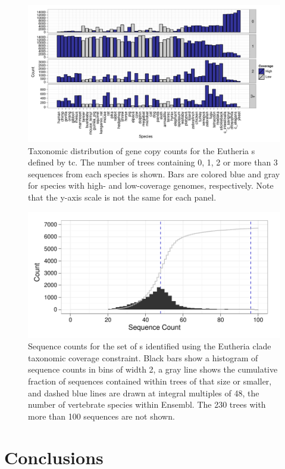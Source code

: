 \begin{landscape}
\begin{figure}
\centering
\includegraphics[scale=0.9]{Figs/ortholog_euth_dups.pdf}
\caption{Taxonomic distribution of gene copy counts for the Eutheria
  \subtr{}s defined by \ac{tc}. The number of trees containing 0, 1, 2 or more than 3
  sequences from each species is shown. Bars are colored blue and gray
  for species with high- and low-coverage genomes, respectively. Note
  that the y-axis scale is not the same for each panel.}
\label{ortholog_euth_dups}
\end{figure}
\end{landscape}

\begin{figure}
\centering
\includegraphics[scale=0.9]{Figs/ensembl_euth_hist.pdf}
\caption{Sequence counts for the set of \subtr{}s identified using the
  Eutheria clade taxonomic coverage constraint. Black bars show a
  histogram of sequence counts in bins of width 2, a gray line shows
  the cumulative fraction of sequences contained within trees of that
  size or smaller, and dashed blue lines are drawn at integral
  multiples of 48, the number of vertebrate species within
  Ensembl. The 230 trees with more than 100 sequences are not shown.}
\label{ensembl_euth_hist}
\end{figure}

\section{Conclusions}


